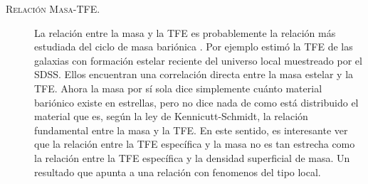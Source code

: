 \documentclass{article}
\begin{document}
\begin{description}
%
\item[\textsc{Relación Masa-TFE.}] La relación entre la masa y la TFE es probablemente la relación
más estudiada del ciclo de masa bariónica \citep[e.\,g.][]{Schmidt1959, Kennicutt1998}. Por ejemplo
\citet{Brinchmann2004} estimó la TFE de las galaxias con formación estelar reciente del universo
local muestreado por el SDSS. Ellos encuentran una correlación directa entre la masa estelar y la
TFE.
Ahora la masa por sí sola dice simplemente cuánto material bariónico existe en estrellas, pero no
dice nada de como está distribuido el material que es, según la ley de Kennicutt-Schmidt, la
relación fundamental entre la masa y la TFE. En este sentido, es interesante ver que la relación
entre la TFE específica y la masa no es tan estrecha como la relación entre la TFE específica y la
densidad superficial de masa. Un resultado que apunta a una relación con fenomenos del tipo local.


\end{description}
\end{document}
